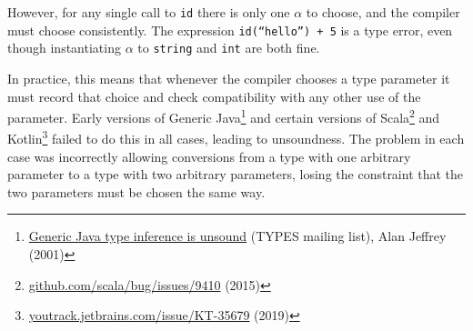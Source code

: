 \documentclass[11pt,oneside]{article}
\newcommand{\code}[1]{\texttt{#1}}
\begin{document}
However, for any single call to \code{id} there is only one \(α\) to choose, and the compiler must choose consistently. The expression \code{id(“hello”) + 5} is a type error, even though instantiating \(α\) to \code{string} and \code{int} are both fine.

In practice, this means that whenever the compiler chooses a type parameter it must record that choice and check compatibility with any other use of the parameter. Early versions of Generic Java\footnote{\href{https://www.seas.upenn.edu/~sweirich/types/archive/1999-2003/msg00849.html}{Generic Java type inference is unsound} (TYPES mailing list), Alan Jeffrey (2001)} and certain versions of Scala\footnote{\href{https://github.com/scala/bug/issues/9410}{github.com/\allowbreak{}scala/\allowbreak{}bug/\allowbreak{}issues/\allowbreak{}9410} (2015)} and Kotlin\footnote{\href{https://youtrack.jetbrains.com/issue/KT-35679}{youtrack.jetbrains.com/\allowbreak{}issue/\allowbreak{}KT-35679} (2019)} failed to do this in all cases, leading to unsoundness.  The problem in each case was incorrectly allowing conversions from a type with one arbitrary parameter to a type with two arbitrary parameters, losing the constraint that the two parameters must be chosen the same way.
\end{document}
